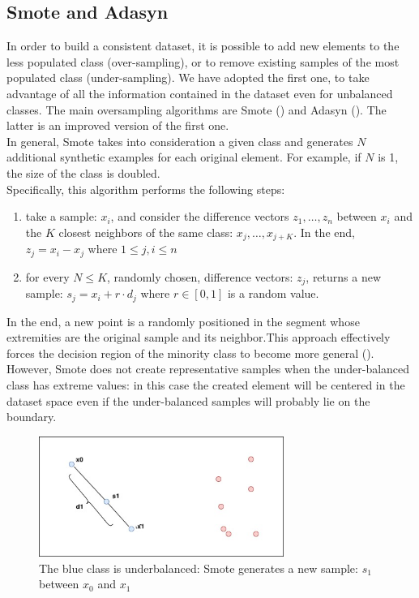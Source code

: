 \documentclass[LaM,binding=0.6cm]{sapthesis}
\begin{document}
\subsection{Smote and Adasyn}
In order to build a consistent dataset, it is possible to add new elements to the less populated class (over-sampling), or to remove existing samples of the most populated class (under-sampling). We have adopted the first one, 
to take advantage of all the information contained in the dataset even for unbalanced classes. The main oversampling algorithms are Smote (\cite{smotepaper}) and Adasyn (\cite{conf/ijcnn/HeBGL08}). The latter is an improved version of the first one. \\In general, Smote takes into consideration a given class and generates $N$ additional synthetic examples for each original element. For example, if $N$ is 1, the size of the class is doubled.\\Specifically, this algorithm performs the following steps:
\begin{enumerate}
\item take a sample: $x_i$, and consider the difference vectors $z_1,\dots,z_n$ between $x_i$ and the $K$ closest neighbors of the same class: ${x_j,\dots,x_{j+K}}$. In the end, $z_j = x_i - x_j$  where $1\leq j,i\leq n$
\item for every $N\leq K$, randomly chosen, difference vectors: $z_j$, returns a new sample: $s_j = x_i+r\cdot d_j$ where $r \in [0,1]$ is a random value.
\end{enumerate}
In the end, a new point is a randomly positioned in the segment whose extremities are the original sample and its neighbor.This approach effectively forces the decision region of the minority class to become more general (\cite{smotepaper}). However, Smote does not create representative samples when the under-balanced class has extreme values: in this case the created element will be centered in the dataset space even if the under-balanced samples will probably lie on the boundary.
\begin{figure}[H]  \centering
	\includegraphics[width=80mm,scale=0.7]{smoteex.png}
	\caption{The blue class is underbalanced: Smote generates a new sample: $s_1$ between $x_0$ and $x_1$}
	\label{fig:smoteex}
\end{figure}
\end{document}
